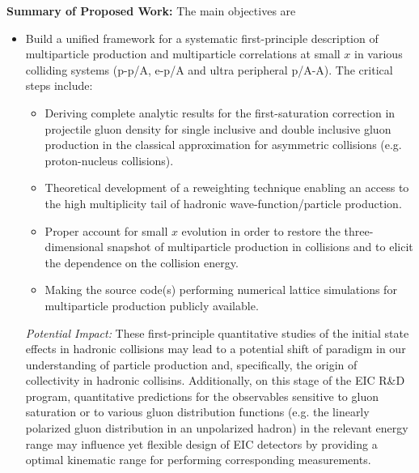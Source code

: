 \vspace{0.5em}
\noindent
{\bf Summary of Proposed Work:}
The main objectives  are 
\begin{itemize}




	\item Build a unified framework for a systematic 
		first-principle description of multiparticle production and
		multiparticle correlations at small $x$ in 
		various colliding systems (p-p/A, e-p/A and ultra peripheral p/A-A). The critical steps include:
		\begin{itemize}
			\item Deriving complete analytic results for the first-saturation correction 
		in projectile gluon density for single inclusive and double inclusive 
		gluon production in the classical approximation for 
		asymmetric collisions (e.g. proton-nucleus collisions).
			\item Theoretical  development of a reweighting technique
		enabling an access to the high multiplicity tail of 
		hadronic wave-function/particle production. 
			\item Proper account for  small $x$ evolution in order to restore the
		three-dimensional snapshot of multiparticle production in collisions
		and to elicit the dependence on the collision energy.
			\item Making the source code(s) performing numerical lattice 
				simulations for multiparticle production publicly available. 
		\end{itemize}

		{\it Potential Impact:} 
		These first-principle quantitative studies of the initial state effects in hadronic collisions 
		may lead to a potential shift of paradigm in our understanding of 
		particle production and, specifically,  the origin of collectivity in hadronic collisins. Additionally, 
		on this stage of 
		the EIC R\&D program, quantitative  predictions for the observables sensitive to 
		gluon saturation or to various gluon distribution functions  
		(e.g. the linearly polarized gluon distribution in an unpolarized hadron)  
		in the relevant energy range 
		may influence yet flexible design of EIC detectors by providing a
		optimal kinematic range for performing corresponding measurements.  


\end{itemize}
